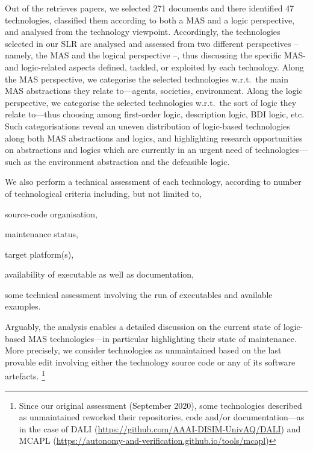 \documentclass[12pt,a4paper,openright,twoside]{book}
\begin{document}
%
Out of the retrieves papers, we selected 271 documents and there identified 47 technologies, classified them according to both a MAS and a logic perspective, and analysed from the technology viewpoint.
%
Accordingly, the technologies selected in our SLR are analysed and assessed from two different perspectives -- namely, the MAS and the logical perspective --, thus discussing the specific MAS- and logic-related aspects defined, tackled, or exploited by each technology.
%
Along the MAS perspective, we categorise the selected technologies w.r.t.\ the main MAS abstractions they relate to---agents, societies, environment.
%
Along the logic perspective, we categorise the selected technologies w.r.t.\ the sort of logic they relate to---thus choosing among first-order logic, description logic, BDI logic, etc.
%
Such categorisations reveal an uneven distribution of logic-based technologies along both MAS abstractions and logics, and highlighting research opportunities on abstractions and logics which are currently in an urgent need of technologies---such as the environment abstraction and the defeasible logic.

We also perform a technical assessment of each technology, according to number of technological criteria including, but not limited to,
%
\begin{inlinelist}
    \item source-code organisation,
    \item maintenance status,
    \item target platform(s),
    \item availability of executable as well as documentation,
    \item some technical assessment involving the run of executables and available examples.
\end{inlinelist}
%
Arguably, the analysis enables a detailed discussion on the current state of logic-based MAS technologies---in particular highlighting their state of maintenance.
%
More precisely, we consider technologies as unmaintained based on the last provable edit involving either the technology source code or any of its software artefacts.
%
\footnote{Since our original assessment (September 2020), some technologies described as unmaintained reworked their repositories, code and/or documentation---as in the case of DALI (\url{https://github.com/AAAI-DISIM-UnivAQ/DALI}) and MCAPL (\url{https://autonomy-and-verification.github.io/tools/mcapl})}

\end{document}

